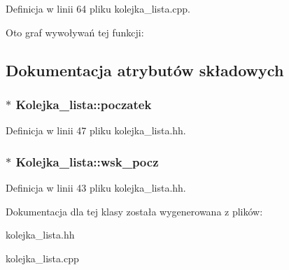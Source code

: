 \-Definicja w linii 64 pliku kolejka\-\_\-lista.\-cpp.



\-Oto graf wywoływań tej funkcji\-:




\subsection{\-Dokumentacja atrybutów składowych}
\hypertarget{class_kolejka__lista_a45d5a866786a9a26a03be24e801ffb89}{
\subsubsection[{poczatek}]{$\ast$ {\bf \-Kolejka\-\_\-lista\-::poczatek}}}\label{class_kolejka__lista_a45d5a866786a9a26a03be24e801ffb89}


\-Definicja w linii 47 pliku kolejka\-\_\-lista.\-hh.

\hypertarget{class_kolejka__lista_aa0e11d9e192e2bfe47f9b9d0016622c7}{
\subsubsection[{wsk\-\_\-pocz}]{$\ast$ {\bf \-Kolejka\-\_\-lista\-::wsk\-\_\-pocz}}}\label{class_kolejka__lista_aa0e11d9e192e2bfe47f9b9d0016622c7}


\-Definicja w linii 43 pliku kolejka\-\_\-lista.\-hh.



\-Dokumentacja dla tej klasy została wygenerowana z plików\-:\begin{DoxyCompactItemize}
\item 
kolejka\-\_\-lista.\-hh\item 
kolejka\-\_\-lista.\-cpp\end{DoxyCompactItemize}
